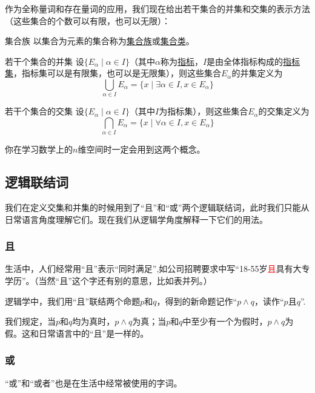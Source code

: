 \documentclass[lang=cn,math=cm,chinesefont=nofont,11pt,scheme=chinese,onecol]{elegantbook}
\begin{document}
作为全称量词和存在量词的应用，我们现在给出若干集合的并集和交集的表示方法（这些集合的个数可以有限，也可以无限）：

\begin{definition}{集合族}
  以集合为元素的集合称为\underline{集合族}或\underline{集合类}。
\end{definition}

\begin{definition}{若干个集合的并集}
  设$\{E_\alpha\mid\alpha\in I\}$（其中$\alpha$称为\underline{指标}，$I$是由全体指标构成的\underline{指标集}，指标集可以是有限集，也可以是无限集），则这些集合$E_\alpha$的并集定义为$$\bigcup_{\alpha\in I}E_\alpha=\{x\mid\exists\alpha\in I,x\in E_\alpha\}$$
\end{definition}

\begin{definition}{若干个集合的交集}
  设$\{E_\alpha\mid\alpha\in I\}$（其中$I$为指标集），则这些集合$E_\alpha$的交集定义为$$\bigcap_{\alpha\in I}E_\alpha=\{x\mid\forall\alpha\in I,x\in E_\alpha\}$$
\end{definition}

你在学习数学上的$n$维空间时一定会用到这两个概念。

\subsection{逻辑联结词}

我们在定义交集和并集的时候用到了“且”和“或”两个逻辑联结词，此时我们只能从日常语言角度理解它们。现在我们从逻辑学角度解释一下它们的用法。

\subsubsection{且}

生活中，人们经常用“且”表示“同时满足”,如公司招聘要求中写“18-55岁\textcolor{red}{且}具有大专学历”。（当然“且”这个字还有别的意思，比如表并列。）

逻辑学中，我们用“且”联结两个命题$p$和$q$，得到的新命题记作“$p\land q$，读作“$p$且$q$”.

我们规定，当$p$和$q$均为真时，$p\land q$为真；当$p$和$q$中至少有一个为假时，$p\land q$为假。这和日常语言中的“且”是一样的。

\subsubsection{或}

“或”和“或者”也是在生活中经常被使用的字词。
\end{document}
